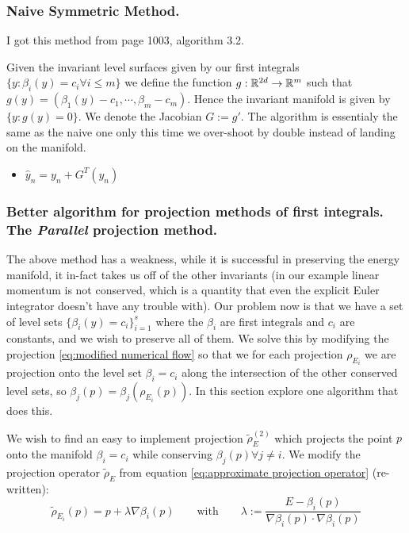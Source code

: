 \documentclass[12pt]{article}
\begin{document}
\subsubsection{Naive Symmetric Method.}
I got this method from \cite{hairer2002geometric} page 1003, algorithm 3.2. 

Given the invariant level surfaces given by our first integrals $\{y:\beta_i(y) = c_i \forall i \leq m\}$ we define the function $g : \mathbb{R}^{2d}\to\mathbb{R}^m$ such that $g(y) = (\beta_1(y) - c_1 , \cdots , \beta_m - c_m)$. Hence the invariant manifold is given by $\{y : g(y)=0\}$. We denote the Jacobian $G := g'$. The algorithm \cite{hairer2002geometric} is essentialy the same as the naive one only this time we over-shoot by double instead of landing on the manifold. 
\begin{itemize}
    \item $\hat y_n = y_n + G^T(y_n)$ 
\end{itemize}


\subsubsection{Better algorithm for projection methods of first integrals. The \textit{Parallel} projection method.}

The above method has a weakness, while it is successful in preserving the energy manifold, it in-fact takes us off of the other invariants (in our example linear momentum is not conserved, which is a quantity that even the explicit Euler integrator doesn't have any trouble with). Our problem now is that we have a set of level sets $\{\beta_i(y) = c_i\}^s_{i=1}$ where the $\beta_i$ are first integrals and $c_i$ are constants, and we wish to preserve all of them. We solve this by modifying the projection \eqref{eq:modified numerical flow} so that we for each projection $\rho_{E_i}$ we are projection onto the level set $\beta_i=c_i$ along the intersection of the other conserved level sets, so $\beta_j(p) = \beta_j(\rho_{E_i}(p))$. In this section explore one algorithm that does this. 

We wish to find an easy to implement projection $\widetilde \rho_E^{(2)}$ which projects the point $p$ onto the manifold $\beta_i=c_i$ while conserving $\beta_j(p)\forall j\neq i$. We modify the projection operator $\widetilde \rho_E$ from equation \eqref{eq:approximate projection operator} (re-written):
$$
\widetilde \rho_{E_i}(p) = p + \lambda \nabla \beta_i(p)\qquad \text{with}\qquad \lambda := \frac{E - \beta_i(p)}{\nabla \beta_i(p) \cdot \nabla \beta_i(p)}
$$
\end{document}

